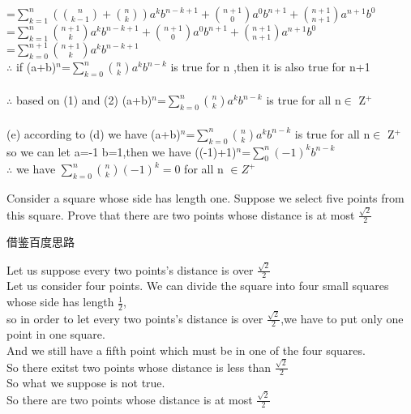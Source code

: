 \documentclass[11pt, a4paper, UTF8]{ctexart}
\begin{document}
\begin{solution}
              =$\sum\limits_{k=1}^{n}(\binom{n}{k-1}+\binom{n}{k})a^kb^{n-k+1}  +  \binom{n+1}{0}a^0b^{n+1}  +  \binom{n+1}{n+1}a^{n+1}b^0$\\
              =$\sum\limits_{k=1}^{n}\binom{n+1}{k}a^kb^{n-k+1}  +  \binom{n+1}{0}a^0b^{n+1}  +  \binom{n+1}{n+1}a^{n+1}b^0$\\
              =$\sum\limits_{k=0}^{n+1}\binom{n+1}{k}a^kb^{n-k+1}$\\
    $\therefore$ if (a+b)$^n$=$\sum\limits_{k=0}^{n}\binom{n}{k}  a^k b^{n-k}$ is true for n ,then it is also true for n+1\\
    \\
    $\therefore$ based on (1) and (2) (a+b)$^n$=$\sum\limits_{k=0}^{n}\binom{n}{k}  a^k b^{n-k}$ is true for all n$\in$ Z$^+$\\
    \\
(e) according to (d) we have  (a+b)$^n$=$\sum\limits_{k=0}^{n}\binom{n}{k}  a^k b^{n-k}$ is true for all n$\in$ Z$^+$\\
    so we can let a=-1 b=1,then we have ((-1)+1)$^n$=$\sum\limits_{0}^{n}(-1)^{k}b^{n-k}$\\
    $\therefore$ we have $\sum\limits_{k=0}^{n}\binom{n}{k}(-1)^k  =  0$ for all n $\in  Z^+$ 

\end{solution}




\begin{problem}[ES:24.4]
Consider a square whose side has length one. Suppose we select five points from this square. Prove that there are two points whose distance is at most $\frac{\sqrt{2}}{2}$
\end{problem}

\begin{remark}
借鉴百度思路
\end{remark}


\begin{solution}
Let us suppose every two points's distance is over $\frac{\sqrt{2}}{2}$\\
Let us consider four points.
We can divide the square into four small squares whose side has length $\frac{1}{2}$, \\
so in order to let every two points's distance is over $\frac{\sqrt{2}}{2}$,we have to put only one point in one square.\\
And we still have a fifth point which must be in one of the four squares.\\
So there exitst two points whose distance is less than $\frac{\sqrt{2}}{2}$\\
So what we suppose is not true.\\
So there are two points whose distance is at most $\frac{\sqrt{2}}{2}$\\



\end{solution}
\end{document}
